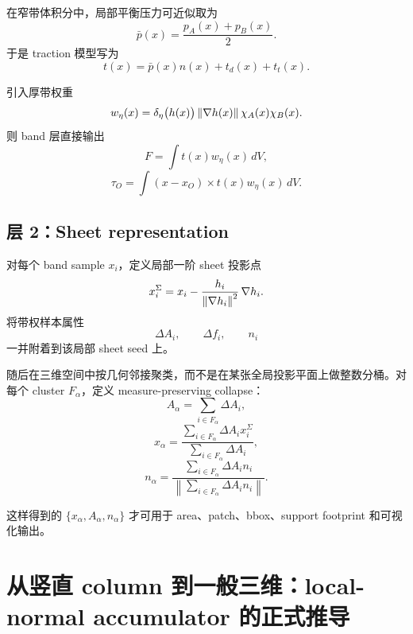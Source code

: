 \documentclass[12pt,a4paper]{ctexart}
\begin{document}
在窄带体积分中，局部平衡压力可近似取为
\begin{equation}
    \bar p(x)=\frac{p_A(x)+p_B(x)}{2}.
\end{equation}
于是 traction 模型写为
\begin{equation}
    t(x)=\bar p(x)n(x)+t_d(x)+t_t(x).
\end{equation}

引入厚带权重
\begin{equation}
    w_\eta(x)=\delta_\eta\bigl(h(x)\bigr)\,\norm{\nabla h(x)}\,\chi_A(x)\chi_B(x).
\end{equation}
则 band 层直接输出
\begin{equation}
    F = \int t(x)w_\eta(x)\,dV,
\end{equation}
\begin{equation}
    \tau_O = \int (x-x_O)\times t(x)w_\eta(x)\,dV.
\end{equation}

\subsection{层 2：Sheet representation}
对每个 band sample $x_i$，定义局部一阶 sheet 投影点
\begin{equation}
    x_i^{\Sigma}=x_i-\frac{h_i}{\norm{\nabla h_i}^2}\,\nabla h_i.
\end{equation}
将带权样本属性
\begin{equation}
    \Delta A_i,\qquad \Delta f_i,\qquad n_i
\end{equation}
一并附着到该局部 sheet seed 上。

随后在三维空间中按几何邻接聚类，而不是在某张全局投影平面上做整数分桶。对每个 cluster $F_\alpha$，定义 measure-preserving collapse：
\begin{equation}
    A_\alpha = \sum_{i\in F_\alpha}\Delta A_i,
\end{equation}
\begin{equation}
    x_\alpha = \frac{\sum_{i\in F_\alpha}\Delta A_i x_i^{\Sigma}}{\sum_{i\in F_\alpha}\Delta A_i},
\end{equation}
\begin{equation}
    n_\alpha = \frac{\sum_{i\in F_\alpha}\Delta A_i n_i}{\left\|\sum_{i\in F_\alpha}\Delta A_i n_i\right\|}.
\end{equation}

这样得到的 $\{x_\alpha,A_\alpha,n_\alpha\}$ 才可用于 area、patch、bbox、support footprint 和可视化输出。

\section{从竖直 column 到一般三维：local-normal accumulator 的正式推导}
\end{document}
